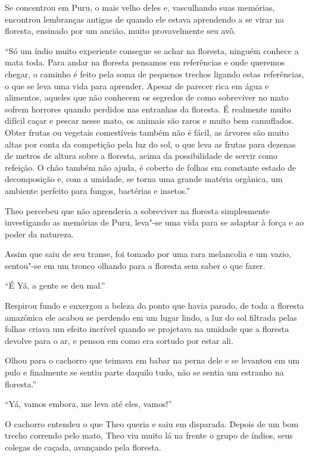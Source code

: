 Se concentrou em Puru, o mais velho deles e, vasculhando suas memórias,
encontrou lembranças antigas de quando ele estava aprendendo a se virar
na floresta, ensinado por um ancião, muito provavelmente seu avô.

``Só um índio muito experiente consegue se achar na floresta, ninguém
conhece a mata toda. Para andar na floresta pensamos em referências e
onde queremos chegar, o caminho é feito pela soma de pequenos trechos
ligando estas referências, o que se leva uma vida para aprender. Apesar
de parecer rica em água e alimentos, aqueles que não conhecem os
segredos de como sobreviver no mato sofrem horrores quando perdidos nas
entranhas da floresta. É realmente muito difícil caçar e pescar nesse
mato, os animais são raros e muito bem camuflados. Obter frutas ou
vegetais comestíveis também não é fácil, as árvores são muito altas por
conta da competição pela luz do sol, o que leva as frutas para dezenas
de metros de altura sobre a floresta, acima da possibilidade de servir
como refeição. O chão também não ajuda, é coberto de folhas em constante
estado de decomposição e, com a umidade, se torna uma grande matéria
orgânica, um ambiente perfeito para fungos, bactérias e insetos.''

Theo percebeu que não aprenderia a sobreviver na floresta simplesmente
investigando as memórias de Puru, leva"-se uma vida para se adaptar à
força e ao poder da natureza.

Assim que saiu de seu transe, foi tomado por uma rara melancolia e um
vazio, sentou"-se em um tronco olhando para a floresta sem saber o que
fazer.

``É Yá, a gente se deu mal.''

Respirou fundo e enxergou a beleza do ponto que havia parado, de toda a
floresta amazônica ele acabou se perdendo em um lugar lindo, a luz do
sol filtrada pelas folhas criava um efeito incrível quando se projetava
na umidade que a floresta devolve para o ar, e pensou em como era
sortudo por estar ali.

Olhou para o cachorro que teimava em babar na perna dele e se levantou
em um pulo e finalmente se sentiu parte daquilo tudo, não se sentia um
estranho na floresta.''

``Yá, vamos embora, me leva até eles, vamos!''

O cachorro entendeu o que Theo queria e saiu em disparada. Depois de um
bom trecho correndo pelo mato, Theo viu muito lá na frente o grupo de
índios, seus colegas de caçada, avançando pela floresta.

